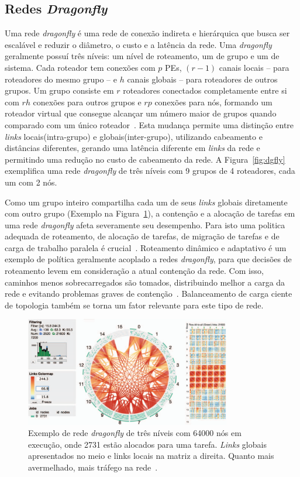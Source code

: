 \documentclass[
	12pt,				%
	openright,			%
	twoside,			%
	a4paper,			%
	english,			%
	brazil,				%
	]{abntex2}
\newcommand{\links}{\textit{links}\xspace}
\newcommand{\Links}{\textit{Links}\xspace}
\newcommand{\dgfly}{\textit{dragonfly}\xspace}
\newcommand{\Dgfly}{\textit{Dragonfly}\xspace}
\begin{document}
\subsection{Redes \textit{\Dgfly}}
\label{sec:dgfly}

Uma rede \dgfly é uma rede de conexão indireta e hierárquica que busca ser escalável e reduzir o diâmetro, o custo e a latência da rede.
Uma \dgfly geralmente possuí três níveis: um nível de roteamento, um de grupo e um de sistema.
Cada roteador tem conexões com $p$ PEs, $(r - 1)$ canais locais -- para roteadores do mesmo grupo -- e $h$ canais globais -- para roteadores de outros grupos. Um grupo consiste em $r$ roteadores conectados completamente entre si com $rh$ conexões para outros grupos e $rp$ conexões para nós, formando um roteador virtual que consegue alcançar um número maior de grupos quando comparado com um único roteador~\cite{kim:2008}.
Esta mudança permite uma distinção entre \links locais(intra-grupo) e globais(inter-grupo), utilizando cabeamento e distâncias diferentes, gerando uma latência diferente em \links da rede e permitindo uma redução no custo de cabeamento da rede.
A Figura~\ref{fig:dgfly} exemplifica uma rede \dgfly de três níveis com 9 grupos de 4 roteadores, cada um com 2 nós.

Como um grupo inteiro compartilha cada um de seus \links globais diretamente com outro grupo (Exemplo na Figura~\ref{fig:dgfly_bhat}), a contenção e a alocação de tarefas em uma rede \dgfly afeta severamente seu desempenho.
Para isto uma politica adequada de roteamento, de alocação de tarefas, de migração de tarefas e de carga de trabalho paralela é crucial~\cite{dragonfly}. 
Roteamento dinâmico e adaptativo é um exemplo de política geralmente acoplado a redes \dgfly, para que decisões de roteamento levem em consideração a atual contenção da rede. 
Com isso, caminhos menos sobrecarregados são tomados, distribuindo melhor a carga da rede e evitando problemas graves de contenção~\cite{kim:2008}. 
Balanceamento de carga ciente de topologia também se torna um fator relevante para este tipo de rede.

\begin{figure} [h]
\includegraphics[width=0.8\textwidth]{dgfly_bhat}
\centering
\caption[Exemplo de rede \dgfly de três níveis com 64000 nós em execução, onde 2731 estão alocados para uma tarefa]{Exemplo de rede \dgfly de três níveis com 64000 nós em execução, onde 2731 estão alocados para uma tarefa. \Links globais apresentados no meio e links locais na matriz a direita. Quanto mais avermelhado, mais tráfego na rede~\cite{dragonfly}.}
\label{fig:dgfly_bhat}
\end{figure}
\end{document}
